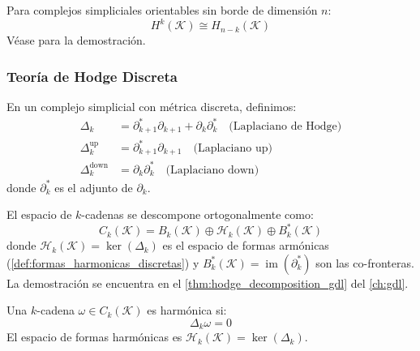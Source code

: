 \begin{theorem}\label{thm:dualidad_poincare_complejos}
Para complejos simpliciales orientables sin borde de dimensión $n$:
\begin{equation}
    H^k(\mathcal{K}) \cong H_{n-k}(\mathcal{K})
\end{equation}
Véase \citep{Hatcher2002} para la demostración.
\end{theorem}

\subsubsection{Teoría de Hodge Discreta}

\begin{definition}\label{def:operadores_hodge_discretos}
En un complejo simplicial con métrica discreta, definimos:
\begin{align}
    \Delta_k &= \partial_{k+1}^* \partial_{k+1} + \partial_k \partial_k^* \quad \text{(Laplaciano de Hodge)} \\
    \Delta_k^{\text{up}} &= \partial_{k+1}^* \partial_{k+1} \quad \text{(Laplaciano up)} \\
    \Delta_k^{\text{down}} &= \partial_k \partial_k^* \quad \text{(Laplaciano down)}
\end{align}
donde $\partial_k^*$ es el adjunto de $\partial_k$.
\end{definition}

\begin{theorem}\label{thm:descomposicion_hodge_discreta}
El espacio de $k$-cadenas se descompone ortogonalmente como:
\begin{equation}
    C_k(\mathcal{K}) = B_k(\mathcal{K}) \oplus \mathcal{H}_k(\mathcal{K}) \oplus B_k^*(\mathcal{K})
\end{equation}
donde $\mathcal{H}_k(\mathcal{K}) = \ker(\Delta_k)$ es el espacio de formas armónicas (\autoref{def:formas_harmonicas_discretas}) y $B_k^*(\mathcal{K}) = \operatorname{im}(\partial_k^*)$ son las co-fronteras. La demostración se encuentra en el \autoref{thm:hodge_decomposition_gdl} del \autoref{ch:gdl}.
\end{theorem}

\begin{definition}\label{def:formas_harmonicas_discretas}
Una $k$-cadena $\omega \in C_k(\mathcal{K})$ es harmónica si:
\begin{equation}
    \Delta_k \omega = 0
\end{equation}
El espacio de formas harmónicas es $\mathcal{H}_k(\mathcal{K}) = \ker(\Delta_k)$.
\end{definition}

